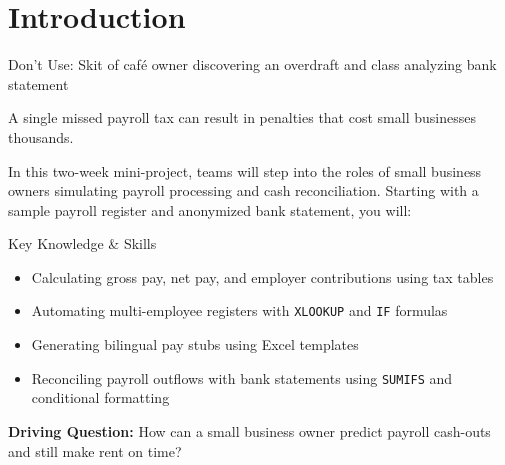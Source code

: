 
\section{Introduction}
\begin{Replace}
Don't Use: Skit of café owner discovering an overdraft and class analyzing bank statement
\end{Replace}

\begin{Trivia}
A single missed payroll tax can result in penalties that cost small businesses thousands.
\end{Trivia}

In this two-week mini-project, teams will step into the roles of small business owners simulating payroll processing and cash reconciliation. Starting with a sample payroll register and anonymized bank statement, you will:

\begin{skillbox}{Key Knowledge \& Skills}
\begin{itemize}
  \item Calculating gross pay, net pay, and employer contributions using tax tables
  \item Automating multi-employee registers with \texttt{XLOOKUP} and \texttt{IF} formulas
  \item Generating bilingual pay stubs using Excel templates
  \item Reconciling payroll outflows with bank statements using \texttt{SUMIFS} and conditional formatting
\end{itemize}
\end{skillbox}

\begin{Important}
\textbf{Driving Question:} How can a small business owner predict payroll cash-outs and still make rent on time?
\end{Important}


\clearpage
